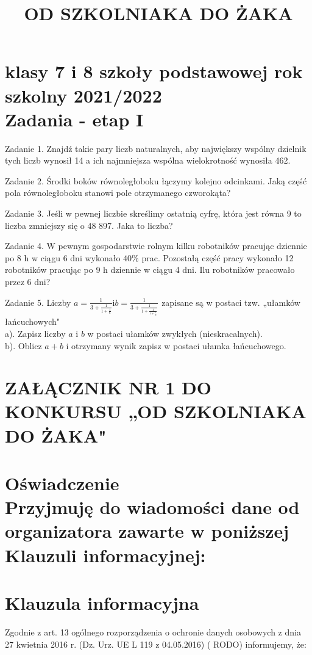 \documentclass[10pt]{article}
\title{OD SZKOLNIAKA DO ŻAKA }
\author{}
\date{}
\begin{document}
\maketitle
\section*{klasy 7 i 8 szkoły podstawowej rok szkolny 2021/2022 \\
 Zadania - etap I}
Zadanie 1. Znajdź takie pary liczb naturalnych, aby największy wspólny dzielnik tych liczb wynosił 14 a ich najmniejsza wspólna wielokrotność wynosiła 462.

Zadanie 2. Środki boków równoległoboku łączymy kolejno odcinkami. Jaką część pola równoległoboku stanowi pole otrzymanego czworokąta?

Zadanie 3. Jeśli w pewnej liczbie skreślimy ostatnią cyfrę, która jest równa 9 to liczba zmniejszy się o 48 897. Jaka to liczba?

Zadanie 4. W pewnym gospodarstwie rolnym kilku robotników pracując dziennie po 8 h w ciągu 6 dni wykonało \(40 \%\) prac. Pozostałą część pracy wykonało 12 robotników pracując po 9 h dziennie w ciągu 4 dni. Ilu robotników pracowało przez 6 dni?

Zadanie 5. Liczby \(a=\frac{1}{3+\frac{1}{1+\frac{1}{6}}} \mathrm{i} b=\frac{1}{3+\frac{1}{1+\frac{1}{1+\frac{1}{2}}}}\) zapisane są w postaci tzw. „ułamków łańcuchowych"\\
a). Zapisz liczby \(a\) i \(b\) w postaci ułamków zwykłych (nieskracalnych).\\
b). Oblicz \(a+b\) i otrzymany wynik zapisz w postaci ułamka łańcuchowego.

\section*{ZAŁĄCZNIK NR 1 DO KONKURSU „OD SZKOLNIAKA DO ŻAKA"}
\section*{Oświadczenie \\
 Przyjmuję do wiadomości dane od organizatora zawarte w poniższej Klauzuli informacyjnej:}
\section*{Klauzula informacyjna}
Zgodnie z art. 13 ogólnego rozporządzenia o ochronie danych osobowych z dnia 27 kwietnia 2016 r. (Dz. Urz. UE L 119 z 04.05.2016) ( RODO) informujemy, że:
\end{document}
